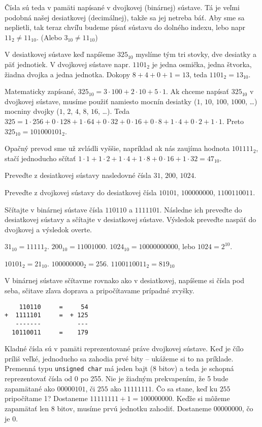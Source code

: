 \medskip
Čísla sú teda v pamäti napísané v dvojkovej (binárnej) sústave. Tá je veľmi
podobná našej desiatkovej (decimálnej), takže sa jej netreba báť.  Aby sme sa
neplietli, tak teraz chvíľu budeme písať sústavu do dolného indexu, lebo napr
$11_2 \neq 11_{10}$. (Alebo $3_{10} \neq 11_{10}$)

V desiatkovej sústave keď napíšeme $325_{10}$ myslíme tým tri stovky, dve
desiatky a päť jednotiek. V dvojkovej sústave napr. $1101_2$ je jedna osmička,
jedna štvorka, žiadna dvojka a jedna jednotka. Dokopy $8+4+0+1 = 13$, teda
$1101_2 = 13_{10}$. 

Matematicky zapísané, $325_{10} = 3\cdot 100 + 2\cdot 10 + 5\cdot 1$. Ak chceme
napísať $325_{10}$ v dvojkovej sústave, musíme použiť namiesto mocnín desiatky
($1$, $10$, $100$, $1000$, \dots) mocniny dvojky ($1$, $2$, $4$, $8$, $16$,
\dots). Teda $325 = 1\cdot 256 + 0\cdot 128 + 1\cdot 64 + 0\cdot 32 + 0\cdot 16
+ 0\cdot 8 + 1\cdot 4 + 0\cdot 2 + 1\cdot 1$.  Preto $325_{10} = 101000101_2$.

Opačný prevod sme už zvládli vyššie, napríklad ak nás zaujíma hodnota
$101111_2$, stačí jednoducho sčítať $1\cdot 1 + 1\cdot 2 + 1\cdot 4 + 1\cdot 8
+ 0\cdot 16 + 1\cdot 32 = 47_{10}$.

\cvicenie Preveďte z desiatkovej sústavy nasledovné čísla $31$, $200$,
$1024$.

\cvicenie Preveďte z dvojkovej sústavy do desiatkovej čísla $10101$,
$100000000$, $1100110011$.

\cvicenie Sčítajte v binárnej sústave čísla $110110$ a $1111101$. Následne
ich preveďte do desiatkovej sústavy a sčítajte v desiatkovej sústave. Výsledok
preveďte naspäť do dvojkovej a výsledok overte.

\riesenie $31_{10} = 11111_2$. $200_{10} = 11001000$. $1024_{10} =
10000000000$, lebo $1024 = 2^{10}$.

\riesenie $10101_2 = 21_{10}$. $100000000_2 = 256$. $1100110011_2 =
819_{10}$

\riesenie V binárnej sústave sčítavme rovnako ako v desiatkovej, napíšeme si
čísla pod seba, sčitave zľava doprava a pripočítavame prípadné zvyšky.
\begin{verbatim}
    110110     =     54
+  1111101     =  + 125
   -------          ---
  10110011     =    179
\end{verbatim}

\medskip

Kladné čísla sú v pamäti reprezentované práve dvojkovej sústave. Keď je čílo
príliš veľké, jednoducho sa zahodia prvé bity -- ukážeme si to na príklade.
Premenná typu \verb!unsigned char! má jeden bajt (8 bitov) a teda je schopná
reprezentovať čísla od 0 po 255. Nie je žiadným prekvapením, že 5 bude
zapamätané ako $00000101$, či $255$ ako $11111111$. Čo sa stane, keď ku $255$
pripočítame 1? Dostaneme $11111111 + 1 = 100000000$.  Keďže si môžeme zapamätať
len 8 bitov, musíme prvú jednotku zahodiť. Dostaneme $00000000$, čo je 0.


